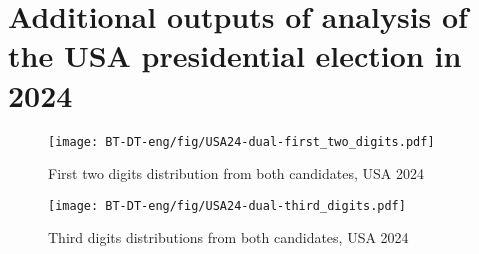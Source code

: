 \chapter{Additional outputs of analysis of the USA presidential election in 2024}






\begin{figure}[h]
    \centering
    \caption{First two digits distribution from both candidates, USA 2024}
    \texttt{[image: BT-DT-eng/fig/USA24-dual-first\_two\_digits.pdf]}
    \label{fig:USA24-dual-first_two_digits}
\end{figure}

\begin{figure}[h]
    \centering
    \caption{Third digits distributions from both candidates, USA 2024}
    \texttt{[image: BT-DT-eng/fig/USA24-dual-third\_digits.pdf]}
    \label{fig:USA24-dual-third_digits}
\end{figure}







